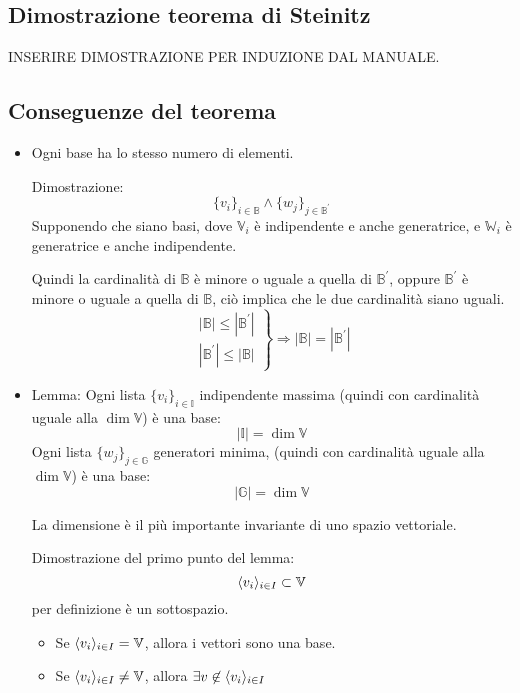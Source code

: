 \documentclass[a4paper,12pt]{article}
\begin{document}
	\subsection{Dimostrazione teorema di Steinitz}
	INSERIRE DIMOSTRAZIONE PER INDUZIONE DAL MANUALE.
	
	\subsection{Conseguenze del teorema}
	\begin{itemize}
		\item Ogni base ha lo stesso numero di elementi.
	
			Dimostrazione:
			\[\{v_i\}_{i \in \mathbb{B}} \wedge \{w_j\}_{j \in \mathbb{B}^\prime}\]
			Supponendo che siano basi, dove $\mathbb{V}_i$ è indipendente e anche generatrice, e $\mathbb{W}_i$ è generatrice e anche indipendente.
			
			Quindi la cardinalità di $\mathbb{B}$ è minore o uguale a quella di $\mathbb{B}^\prime$, oppure $\mathbb{B}^\prime$ è minore o uguale a quella di $\mathbb{B}$, ciò implica che le due cardinalità siano uguali.
			\[\left.
				\begin{aligned}
				|\mathbb{B}| \leq |\mathbb{B}^\prime| \\
				|\mathbb{B}^\prime| \leq |\mathbb{B}|
				\end{aligned}
			\right\} \Rightarrow |\mathbb{B}| = |\mathbb{B}^\prime|\]
		
		\item Lemma: Ogni lista $\{v_i\}_{i \in \mathbb{I}}$ indipendente massima (quindi con cardinalità uguale alla $\dim \mathbb{V}$) è una base:
		\[|\mathbb{I}| = \dim \mathbb{V}\]
		Ogni lista $\{w_j\}_{j \in \mathbb{G}}$ generatori minima, (quindi con cardinalità uguale alla $\dim \mathbb{V}$) è una base:
		\[|\mathbb{G}| = \dim \mathbb{V}\]
		
		La dimensione è il più importante invariante di uno spazio vettoriale. %
		
		Dimostrazione del primo punto del lemma:
		\[\langle v_i \rangle_{i \in I} \subset \mathbb{V}\]
		per definizione è un sottospazio.
		\begin{itemize}
			\item Se $\langle v_i \rangle_{i \in I} = \mathbb{V}$, allora i vettori sono una base.
			\item Se $\langle v_i \rangle_{i \in I} \not = \mathbb{V}$, allora $\exists v \not \in \langle v_i \rangle_{i \in I}$
		\end{itemize}
		

\end{itemize}
\end{document}
